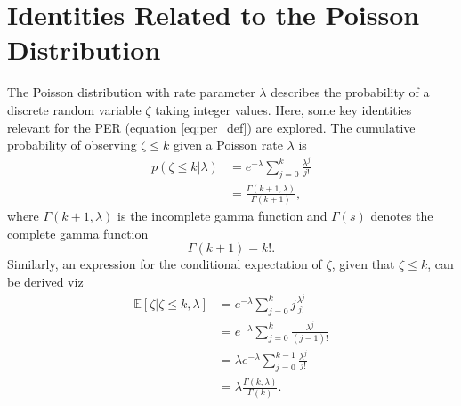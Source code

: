 \section{Identities Related to the Poisson Distribution}
\label{sec:poisson_identities}
The Poisson distribution with rate parameter $\lambda$ describes the probability of a discrete random variable $\zeta$ taking integer values. Here, some key identities relevant for the PER (equation \eqref{eq:per_def}) are explored. The cumulative probability of observing $\zeta \leq k$ given a Poisson rate $\lambda$ is
\begin{equation}
	\begin{split}
		p(\zeta \leq k | \lambda) &= e^{-\lambda} \sum_{j=0}^k \frac{\lambda^j}{j!}\\
		& = \frac{\Gamma(k+1,\lambda)}{\Gamma(k+1)},
	\end{split}
\end{equation}
where $\Gamma(k+1,\lambda)$ is the incomplete gamma function and $\Gamma(s)$ denotes the complete gamma function
\begin{equation}
	\Gamma(k+1) = k!.
\end{equation}
Similarly, an expression for the conditional expectation of $\zeta$, given that $\zeta \leq k$, can be derived viz
\begin{equation}
	\begin{split}
		\mathbb{E}[\zeta | \zeta \leq k, \lambda] &= e^{-\lambda} \sum_{j=0}^k j \frac{\lambda^j}{j!} \\
		&= e^{-\lambda} \sum_{j=0}^{k} \frac{\lambda^{j}}{(j-1)!} \\
		&= \lambda e^{-\lambda} \sum_{j=0}^{k-1} \frac{\lambda^{j}}{j!} \\
		&= \lambda \frac{\Gamma(k, \lambda)}{\Gamma(k)}.
	\end{split}
\end{equation}